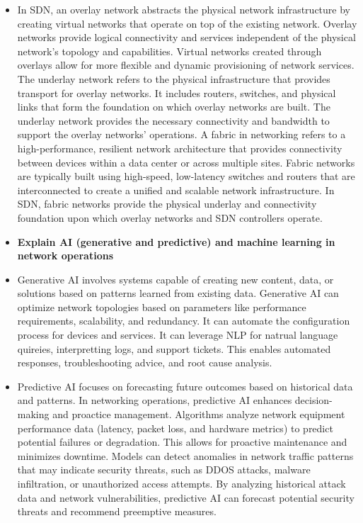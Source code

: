 \documentclass{article}
\begin{document}
\begin{itemize}
	\item[] In SDN, an overlay network abstracts the physical network infrastructure by creating virtual networks that operate on top of the existing network. Overlay networks provide logical connectivity and services independent of the physical network's topology and capabilities. Virtual networks created through overlays allow for more flexible and dynamic provisioning of network services. The underlay network refers to the physical infrastructure that provides transport for overlay networks. It includes routers, switches, and physical links that form the foundation on which overlay networks are built. The underlay network provides the necessary connectivity and bandwidth to support the overlay networks' operations. A fabric in networking refers to a high-performance, resilient network architecture that provides connectivity between devices within a data center or across multiple sites. Fabric networks are typically built using high-speed, low-latency switches and routers that are interconnected to create a unified and scalable network infrastructure. In SDN, fabric networks provide the physical underlay and connectivity foundation upon which overlay networks and SDN controllers operate.
  
  \item \textbf{Explain AI (generative and predictive) and machine learning in network operations}
  	\item[] Generative AI involves systems capable of creating new content, data, or solutions based on patterns learned from existing data. Generative AI can optimize network topologies based on parameters like performance requirements, scalability, and redundancy. It can automate the configuration process for devices and services. It can leverage NLP for natrual language quireies, interpretting logs, and support tickets. This enables automated responses, troubleshooting advice, and root cause analysis.
	\item[] Predictive AI focuses on forecasting future outcomes based on historical data and patterns. In networking operations, predictive AI enhances decision-making and proactice management. Algorithms analyze network equipment performance data (latency, packet loss, and hardware metrics) to predict potential failures or degradation. This allows for proactive maintenance and minimizes downtime. Models can detect anomalies in network traffic patterns that may indicate security threats, such as DDOS attacks, malware infiltration, or unauthorized access attempts. By analyzing historical attack data and network vulnerabilities, predictive AI can forecast potential security threats and recommend preemptive measures.


\end{itemize}
\end{document}

